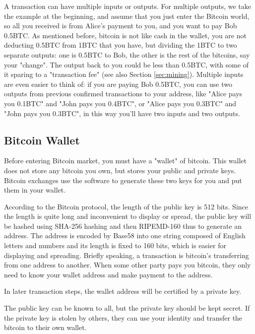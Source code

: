 \documentclass[12pt,a4paper]{article}
\begin{document}
A transaction can have multiple inputs or outputs. For multiple outputs, we take the example at the beginning, and assume that you just enter the Bitcoin world, so all you received is from Alice's payment to you, and you want to pay Bob 0.5BTC. As mentioned before, bitcoin is not like cash in the wallet, you are not deducting 0.5BTC from 1BTC that you have, but dividing the 1BTC to two separate outputs: one is 0.5BTC to Bob, the other is the rest of the bitcoins, say your "change". The output back to you could be less than 0.5BTC, with some of it sparing to a "transaction fee" (see also Section \ref{sec:mining}). Multiple inputs are even easier to think of: if you are paying Bob 0.5BTC, you can use two outputs from previous confirmed transactions to your address, like "Alice pays you 0.1BTC" and "John pays you 0.4BTC", or "Alice pays you 0.3BTC" and "John pays you 0.3BTC", in this way you'll have two inputs and two outputs.

\subsection{Bitcoin Wallet}
Before entering Bitcoin market, you must have a "wallet" of bitcoin. This wallet does not store any bitcoin you own, but stores your public and private keys. 
Bitcoin exchanges use the software to generate these two keys for you and put them in your wallet.

According to the Bitcoin protocol, the length of the public key is 512 bits. Since the length is quite long and inconvenient to display or spread, the public key will be hashed using SHA-256 hashing and then RIPEMD-160 thus to generate an address. The address is encoded by Base58 into one string composed of English letters and numbers and its length is fixed to 160 bits, which is easier for displaying and spreading. Briefly speaking, a transaction is bitcoin's transferring from one address to another. When some other party pays you bitcoin, they only need to know your wallet address and make payment to the address. 

In later transaction steps, the wallet address will be certified by a private key.

The public key can be known to all, but the private key should be kept secret. If the private key is stolen by others, they can use your identity and transfer the bitcoin to their own wallet.
\end{document}
